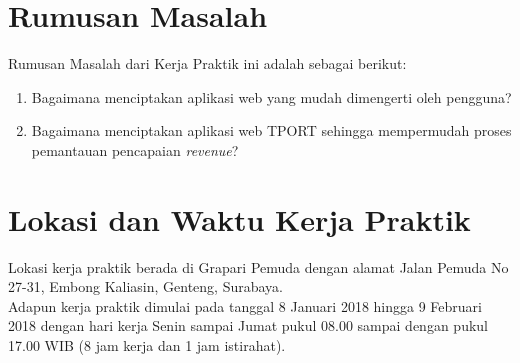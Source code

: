 \section{Rumusan Masalah}
Rumusan Masalah dari Kerja Praktik ini adalah sebagai berikut:

\begin{enumerate}
	\item Bagaimana menciptakan aplikasi web yang mudah dimengerti oleh pengguna?
	\item Bagaimana menciptakan aplikasi web TPORT sehingga mempermudah proses pemantauan pencapaian \textit{revenue}?
\end{enumerate}

\section{Lokasi dan Waktu Kerja Praktik}
\tab Lokasi kerja praktik berada di Grapari Pemuda dengan alamat Jalan Pemuda No 27-31, Embong Kaliasin, Genteng, Surabaya.\\
\tab Adapun kerja praktik dimulai pada tanggal 8 Januari 2018 hingga 9 Februari 2018 dengan hari kerja Senin sampai Jumat pukul 08.00 sampai dengan pukul 17.00 WIB (8 jam kerja dan 1 jam istirahat).

